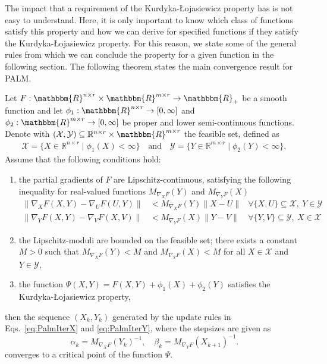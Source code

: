 The impact that a requirement of the Kurdyka-{\L}ojasiewicz property has is not easy to understand. Here, it is only important to know which class of functions satisfy this property and how we can derive for specified functions if they satisfy the Kurdyka-{\L}ojasiewicz property. For this reason, we state some of the general rules from which we can conclude the \KL property for a given function in the following section. The following theorem states the main convergence result for PALM.

\begin{theorem}{{\citep{bolte2014proximal}}}\label{thm:palmConv}
Let $F:\mathbbm{R}^{n\times r}\times \mathbbm{R}^{m\times r}\rightarrow \mathbbm{R}_+$ be a smooth function and let $\phi_1:\mathbbm{R}^{n\times r}\rightarrow [0,\infty]$ and $\phi_2:\mathbbm{R}^{m\times r}\rightarrow [0,\infty]$ be proper and lower semi-continuous functions. Denote with $(\mathcal{X},\mathcal{Y})\subseteq\mathbb{R}^{n\times r}\times \mathbbm{R}^{m\times r}$ the feasible set, defined as
\begin{align*}
    \mathcal{X} = \{X\in \mathbb{R}^{n\times r}\mid \phi_1(X)<\infty\}\quad \text{and} \quad \mathcal{Y} = \{Y\in \mathbb{R}^{m\times r}\mid \phi_2(Y)<\infty\},
\end{align*}
Assume that the following conditions hold:
\begin{enumerate}
\item the partial gradients of $F$ are Lipschitz-continuous, satisfying the following inequality for real-valued functions $M_{\nabla_XF}(Y)$ and $M_{\nabla_YF}(X)$
\begin{align*}
\lVert \nabla_XF(X,Y)-\nabla_UF(U,Y)\rVert &< M_{\nabla_XF}(Y)\lVert X-U\rVert  &\forall \{X,U\} \subseteq \mathcal{X},\ Y\in\mathcal{Y}\\
\lVert \nabla_YF(X,Y)-\nabla_VF(X,V)\rVert &< M_{\nabla_YF}(X)\lVert Y-V\rVert  &\forall \{Y,V\} \subseteq \mathcal{Y},\ X\in\mathcal{X}
\end{align*}
\item the Lipschitz-moduli are bounded on the feasible set; there exists a constant $M>0$ such that $M_{\nabla_XF}(Y)<M$ and $M_{\nabla_YF}(X)<M$ for all $X\in\mathcal{X}$ and $Y\in\mathcal{Y}$,
\item the function $\Psi(X,Y)=F(X,Y)+\phi_1(X)+\phi_2(Y)$ satisfies the Kurdyka-{\L}ojasiewicz property,
\end{enumerate}
then the sequence $(X_k,Y_k)$ generated by the update rules in Eqs.~\eqref{eq:PalmIterX} and \eqref{eq:PalmIterY}, where the stepsizes are given as
\[\alpha_k=M_{\nabla_XF}(Y_k)^{-1}, \quad \beta_k= M_{\nabla_YF}(X_{k+1})^{-1}.\]
converges to a critical point of the function $\Psi$. 
\end{theorem}
